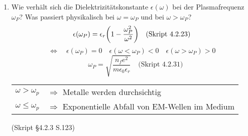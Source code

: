\documentclass{scrartcl}
\newcommand{\ds}{\displaystyle}
\newcommand{\sref}[1]{(Skript #1)}
\newcommand{\smref}[1]{\quad\text{(Skript #1)}}
\begin{document}
\begin{enumerate}
    \item Wie verhält sich die Dielektrizitätskonstante $\epsilon(\omega)$
          bei der Plasmafrequenz $\omega_P$? Was passiert physikalisch bei
          $\omega=\omega_P$ und bei $\omega>\omega_P$?
          $$
          \epsilon(\omega_P)=\epsilon_r\qty(1-\frac{\omega_P^2}{\omega^2})
          \smref{4.2.23}$$
          $$\Leftrightarrow\quad\epsilon(\omega_P)=0
          \quad\epsilon(\omega<\omega_P)<0 
          \quad\epsilon(\omega>\omega_P)>0$$
          $$\quad\omega_P=\sqrt{\frac{n_fe^2}
          {m\epsilon_0\epsilon_r}}\smref{4.2.31}$$
          \begin{tabular}{rl}
            $\ds\omega>\omega_p$ &$\Rightarrow$ 
            Metalle werden durchsichtig\\
            $\ds\omega\le\omega_p$& $\Rightarrow$ Exponentielle 
            Abfall von EM-Wellen im Medium
          \end{tabular}
          \begin{center}
            \sref{§4.2.3 S.123}
          \end{center}

  \end{enumerate}
\end{document}
